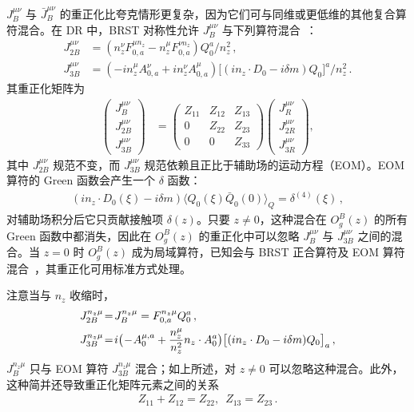 $J^{\mu\nu}_B$ 与 $\bar{J}^{\mu\nu}_B$ 的重正化比夸克情形更复杂，因为它们可与同维或更低维的其他复合算符混合。在 DR 中，BRST 对称性允许 $J^{\mu\nu}_B$
与下列算符混合~\cite{Dorn:1986dt,Zhang:2018diq}：
\begin{align}
	J^{\mu\nu}_{2B} &\!=\! \left(n_z^\nu F^{\mu n_z}_{0,a} - n_z^\mu F^{\nu n_z}_{0,a} \right) Q_0^a/n_z^2\,,\\
	J^{\mu\nu}_{3B} &\!=\! (-in_z^\mu\! A^\nu_{0,a}\! +\! in_z^\nu A^\mu_{0,a})\big[(in_z\cdot\! D_0\!-\!i\delta m)Q_0\big]^a\!/n_z^2\,.
\end{align}
其重正化矩阵为~\cite{Dorn:1986dt}
\begin{align}\label{eq:oprenormmix}
	\begin{pmatrix}
		J_{B}^{\mu\nu} \\  J_{2B}^{\mu\nu} \\ J_{3B}^{\mu\nu}
	\end{pmatrix}
	&=
	\begin{pmatrix}
		Z_{11} & Z_{12} & Z_{13}\\ 0 & Z_{22} & Z_{23} \\ 0 & 0 & Z_{33}
	\end{pmatrix}
	\begin{pmatrix}
		J_{R}^{\mu\nu}\\  J_{2R}^{\mu\nu} \\ J_{3R}^{\mu\nu}
	\end{pmatrix}
	,
\end{align}
其中 $J_{2B}^{\mu\nu}$ 规范不变，而 $J^{\mu\nu}_{3B}$ 规范依赖且正比于辅助场的运动方程（EOM）。EOM 算符的 Green 函数会产生一个 $\delta$ 函数：
\begin{align}
	(in_z\cdot D_0(\xi)-i\delta m)\langle Q_0(\xi)\bar{Q}_0(0)\rangle_Q = \delta^{(4)}(\xi)\,,
\end{align}
对辅助场积分后它只贡献接触项 $\delta(z)$。只要 $z\neq0$，这种混合在 $O^B_g(z)$ 的所有 Green 函数中都消失，因此在 $O^B_g(z)$ 的重正化中可以忽略 $J^{\mu\nu}_{B}$ 与 $J^{\mu\nu}_{3B}$ 之间的混合。当 $z=0$ 时 $O^B_g(z)$ 成为局域算符，已知会与 BRST 正合算符及 EOM 算符混合~\cite{Collins:1994ee}，其重正化可用标准方式处理。

注意当与 $n_z$ 收缩时，
\begin{align}
	J_{2B}^{n_z\mu}&\!=\! J_{B}^{n_z\mu} = F^{n_z\mu}_{0,a}Q_0^a\,,\\
	J_{3B}^{n_z\mu}&\!=\! i\big(\!-\!A^{\mu,a}_{0} + {n_z^\mu\over n_z^2} n_z\cdot A_0^a\big)\big[(in_z\cdot D_0-i\delta m)Q_0\big]_a\,,\nonumber
\end{align}
$J_{B}^{n_z\mu}$ 只与 EOM 算符 $J_{3B}^{n_z\mu}$ 混合；如上所述，对 $z\neq0$ 可以忽略这种混合。此外，这种简并还导致重正化矩阵元素之间的关系~\cite{Dorn:1986dt}
\begin{align}\label{eq:Zrelation}
	Z_{11}+Z_{12}=Z_{22}, \,\,\,  Z_{13}=Z_{23}\,.
\end{align}


